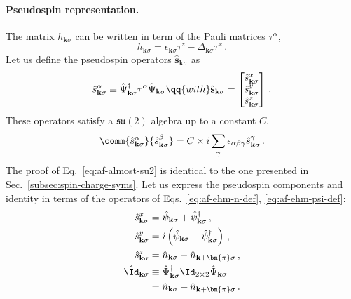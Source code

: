 \paragraph{Pseudospin representation.} The matrix $h_{\mathbf{k}\sigma}$ can be written in term of the Pauli matrices $\tau^\alpha$,
\[
h_{\mathbf{k}\sigma} = \epsilon_{\mathbf{k}\sigma} \tau^z - \Delta_{\mathbf{k}\sigma} \tau^x \, .
\]
Let us define the pseudospin operators $\hat{\mathbf{s}}_{\mathbf{k}\sigma}$ as
\begin{equation}\label{eq:af-pseudospin-def}
	\hat s_{\mathbf{k}\sigma}^\alpha \equiv \hat \Psi_{\mathbf{k}\sigma}^\dagger \tau^\alpha \hat \Psi_{\mathbf{k}\sigma}
	\qq{with}
	\hat{\mathbf{s}}_{\mathbf{k}\sigma} = \begin{bmatrix}
		\hat s_{\mathbf{k}\sigma}^x \\
		\hat s_{\mathbf{k}\sigma}^y \\
		\hat s_{\mathbf{k}\sigma}^z
	\end{bmatrix} \, .
\end{equation}
These operators satisfy a $\mathfrak{su}(2)$ algebra up to a constant $C$,
\begin{equation}\label{eq:af-almost-su2}
	\comm{\hat s_{\mathbf{k}\sigma}^\alpha}{\hat s_{\mathbf{k}\sigma}^\beta} = C \times i\sum_\gamma \epsilon_{\alpha\beta\gamma} \hat s_{\mathbf{k}\sigma}^\gamma \, .
\end{equation}
The proof of Eq.~\eqref{eq:af-almost-su2} is identical to the one presented in Sec.~\ref{subsec:spin-charge-syms}. Let us express the pseudospin components and identity in terms of the operators of Eqs.~\eqref{eq:af-ehm-n-def}, \eqref{eq:af-ehm-psi-def}:
\begin{align}
	\hat s_{\mathbf{k}\sigma}^x &= \hat \psi_{\mathbf{k}\sigma} + \hat \psi_{\mathbf{k}\sigma}^\dagger \, , \label{eq:af-hm-x-psi} \\
	\hat s_{\mathbf{k}\sigma}^y &= i \left(
	\hat \psi_{\mathbf{k}\sigma} - \hat \psi_{\mathbf{k}\sigma}^\dagger 
	\right) \, ,\label{eq:af-hm-y-psi} \\
	\hat s_{\mathbf{k}\sigma}^z &= \hat n_{\mathbf{k}\sigma} - \hat n_{\mathbf{k}+\bm{\pi}\sigma} \, , \label{eq:af-hm-z-psi} \\
	\hat \Id_{\mathbf{k}\sigma} &\equiv \hat \Psi_{\mathbf{k}\sigma}^\dagger \Id_{2\times2} \hat \Psi_{\mathbf{k}\sigma} \nonumber \\
	&= \hat n_{\mathbf{k}\sigma} + \hat n_{\mathbf{k}+\bm{\pi}\sigma} \, . \label{eq:af-hm-id-def}
\end{align}
